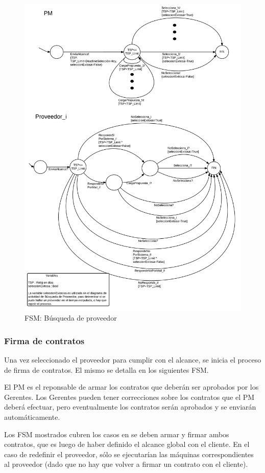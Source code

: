\begin{figure}[H]
\centering
\includegraphics[width=0.8\linewidth]{diag/nuevos/fsm-selprov.png}
\caption{FSM: Búsqueda de proveedor}
\label{fsm-selprov}
\end{figure}


		\subsubsection{Firma de contratos}
Una vez seleccionado el proveedor para cumplir con el alcance, se inicia 
el proceso de firma de contratos. El mismo se detalla en los siguientes FSM. 

El PM es el reponsable de armar los contratos que deberán ser aprobados por los 
Gerentes. Los Gerentes pueden tener correcciones sobre los contratos que el PM 
deberá efectuar, pero eventualmente los contratos serán aprobados y se enviarán 
automáticamente. 

Los FSM mostrados cubren los casos en se deben armar y firmar ambos contratos, 
que es luego de haber definido el alcance global con el cliente. En el caso de 
redefinir el proveedor, sólo se ejecutarían las máquinas correspondientes al 
proveedor (dado que no hay que volver a firmar un contrato con el cliente). 

